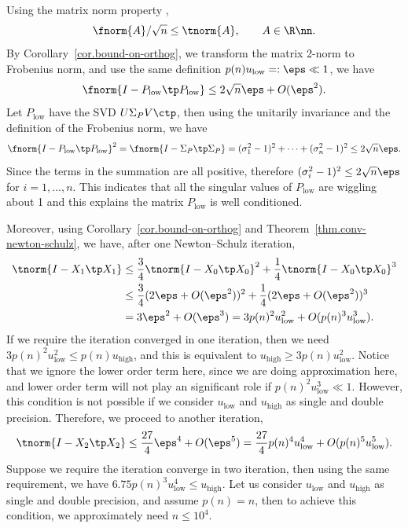 \documentclass{article}
\numberwithin{equation}{section} %
\begin{document}
Using the matrix norm property , 
\begin{equation}\notag
  \fnorm{A}/\sqrt{n} \le \tnorm{A},\qquad A \in \R\nn.
\end{equation}
By Corollary~\ref{cor.bound-on-orthog}, we transform the matrix 2-norm to
Frobenius norm, and use the same definition $ p(n)u_{\mathrm{low}} =: \eps
\ll 1$, we have 
\begin{equation}\notag
  \fnorm{I - P_{\mathrm{low}}\tp P_{\mathrm{low}}} \le
  {2\sqrt{n}\eps} + O(\eps^{2}). 
\end{equation}
Let $P_{\mathrm{low}}$ have the SVD $U\Sigma_{P}V\ctp$, then using
the unitarily invariance and the definition of the Frobenius norm, we have 
\begin{equation}\notag
  \fnorm{I - P_{\mathrm{low}}\tp P_{\mathrm{low}}}^{2}
  = \fnorm{ I - \Sigma_{P}\tp \Sigma_{P}} = 
  (\sigma_{1}^{2} - 1)^{2} + \cdots +
  (\sigma_{n}^{2} - 1)^{2} \le
  2 \sqrt{n} \eps. 
\end{equation}
Since the terms in the summation are all positive, therefore
$(\sigma_{i}^{2} - 1)^{2} \le 2 \sqrt{n} \eps$ for $i = 1,\dots,n$.
This indicates that all the singular values of $P_{\mathrm{low}}$ are
wiggling about 1 and this explains the matrix $P_{\mathrm{low}}$ is
well conditioned.

Moreover, using Corollary~\ref{cor.bound-on-orthog} and
Theorem~\ref{thm.conv-newton-schulz}, we have, after one Newton--Schulz
iteration,  
\begin{align*}
  \tnorm{I - X_{1}\tp X_{1}}
  & \le \frac{3}{4}\tnorm{I - X_{0}\tp X_{0}}^{2} + 
    \frac{1}{4} \tnorm{I - X_{0}\tp X_{0}}^{3} \\
  & \le \frac{3}{4} (2\eps + O(\eps^{2}))^{2} +
    \frac{1}{4} (2\eps + O(\eps^{2}))^{3} \\
  & = 3 \eps^{2} + O(\eps^{3})
    = 3 p(n)^{2} u_{\mathrm{low}}^{2} +
    O(p(n)^{3} u_{\mathrm{low}}^{3}).
\end{align*}
If we require the iteration converged in one iteration, then we need
$3p(n)^{2}u_{\mathrm{low}}^{2} \le p(n)u_{\mathrm{high}}$, and this is 
equivalent to $u_{\mathrm{high}} \ge 3p(n)u_{\mathrm{low}}^{2}$.
Notice that we ignore the lower order term here,
since we are doing approximation here, and lower order term will not play
an significant role if $p(n)^{2}u_{\mathrm{low}}^{3} \ll 1$.
However, this condition is
not possible if we consider $u_{\mathrm{low}}$ and $u_{\mathrm{high}}$ as
single and double precision.
Therefore, we proceed to another iteration,
\begin{equation}\label{eq.devi-orth-2-steps}
  \tnorm{I - X_{2}\tp X_{2}}
  \le \frac{27}{4} \eps^{4} + O(\eps^{5})
  = \frac{27}{4} p(n)^{4} u_{\mathrm{low}}^{4} + O(p(n)^{5}
  u_{\mathrm{low}}^{5}). 
\end{equation}
Suppose we require the iteration converge in two iteration, then using the
same requirement, we have 
$6.75p(n)^{3}u_{\mathrm{low}}^{4} \le u_{\mathrm{high}}$.
Let us consider $u_{\mathrm{low}}$ and $u_{\mathrm{high}}$ as
single and double precision, and assume $p(n) = n$, then to achieve this
condition, we approximately need $n \le 10^{4}$.
\end{document}

